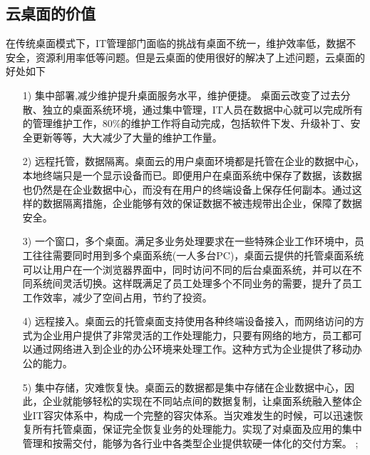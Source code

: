 \documentclass{article}
\begin{document}
\subsection{云桌面的价值}\par
在传统桌面模式下，IT管理部门面临的挑战有桌面不统一，维护效率低，数据不安全，资源利用率低等问题。但是云桌面的使用很好的解决了上述问题，云桌面的好处如下
\begin{itemize}
	\item [1) ] 集中部署,减少维护提升桌面服务水平，维护便捷。
桌面云改变了过去分散、独立的桌面系统环境，通过集中管理，IT人员在数据中心就可以完成所有的管理维护工作，80\%的维护工作将自动完成，包括软件下发、升级补丁、安全更新等等，大大减少了大量的维护工作量。    
	\item [2)]
	远程托管，数据隔离。桌面云的用户桌面环境都是托管在企业的数据中心，本地终端只是一个显示设备而已。即便用户在桌面系统中保存了数据，该数据也仍然是在企业数据中心，而没有在用户的终端设备上保存任何副本。通过这样的数据隔离措施，企业能够有效的保证数据不被违规带出企业，保障了数据安全。　
	\item [3)]
	一个窗口，多个桌面。满足多业务处理要求在一些特殊企业工作环境中，员工往往需要同时用到多个桌面系统(一人多台PC)，桌面云提供的托管桌面系统可以让用户在一个浏览器界面中，同时访问不同的后台桌面系统，并可以在不同系统间灵活切换。这样既满足了员工处理多个不同业务的需要，提升了员工工作效率，减少了空间占用，节约了投资。　
	\item [4)]
	远程接入。桌面云的托管桌面支持使用各种终端设备接入，而网络访问的方式为企业用户提供了非常灵活的工作处理能力，只要有网络的地方，员工都可以通过网络进入到企业的办公环境来处理工作。这种方式为企业提供了移动办公的能力。
	\item [5)]
	集中存储，灾难恢复快。桌面云的数据都是集中存储在企业数据中心，因此，企业就能够轻松的实现在不同站点间的数据复制，让桌面系统融入整体企业IT容灾体系中，构成一个完整的容灾体系。当灾难发生的时候，可以迅速恢复所有托管桌面，保证完全恢复业务的处理能力。实现了对桌面及应用的集中管理和按需交付，能够为各行业中各类型企业提供软硬一体化的交付方案。
;\end{itemize}
\end{document}
